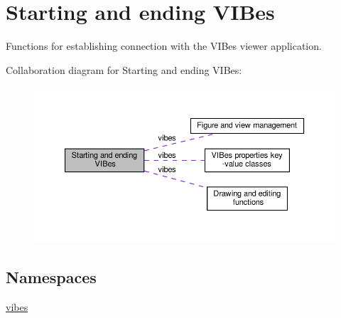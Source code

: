 \hypertarget{group__connection}{}\section{Starting and ending V\+I\+Bes}
\label{group__connection}


Functions for establishing connection with the V\+I\+Bes viewer application.  


Collaboration diagram for Starting and ending V\+I\+Bes\+:\nopagebreak
\begin{figure}[H]
\begin{center}
\leavevmode
\includegraphics[width=350pt]{group__connection}
\end{center}
\end{figure}
\subsection*{Namespaces}
\begin{DoxyCompactItemize}
\item 
 \hyperlink{namespacevibes}{vibes}
\end{DoxyCompactItemize}
